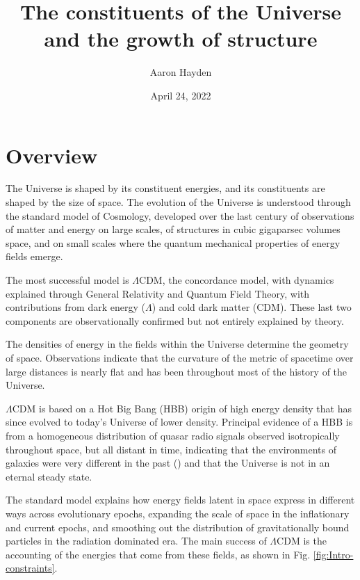 \documentclass{paper}
\begin{document}
 

\title{The constituents of the Universe and the growth of structure}
\author{Aaron Hayden}
\date{April 24, 2022}
\maketitle

\section*{Overview}
  The Universe is shaped by its constituent energies, and its constituents are
  shaped by the size of space. The evolution of the Universe is understood 
  through the standard model of Cosmology, developed over the last century of 
  observations of matter and energy on large scales, of structures in cubic 
  gigaparsec volumes space, and on small scales where the quantum mechanical 
  properties of energy fields emerge. 

  The most successful model is $\Lambda$CDM, the concordance model, with 
  dynamics explained through General Relativity and Quantum Field Theory, with 
  contributions from dark energy ($\Lambda$) and cold dark matter (CDM). These 
  last two components are observationally confirmed but not entirely explained 
  by theory. 

  The densities of energy in the fields within the Universe determine the 
  geometry of space.  Observations indicate that the curvature of the metric 
  of spacetime over large distances is nearly flat and has been throughout 
  most of the history of the Universe.
  
  $\Lambda$CDM is based on a Hot Big Bang (HBB) origin of high energy density 
  that has since evolved to today's Universe of lower density.  Principal 
  evidence of a HBB is from a homogeneous distribution of quasar radio signals 
  observed isotropically throughout space, but all distant in time, indicating 
  that the environments of galaxies were very different in the past 
  (\cite{Secrest_2021}) and that the Universe is not in an eternal steady 
  state. 

  The standard model explains how energy fields latent in space express in 
  different ways across evolutionary epochs, expanding the scale of space in 
  the inflationary and current epochs, and smoothing out the distribution of 
  gravitationally bound particles in the radiation dominated era. The main 
  success of $\Lambda$CDM is the accounting of the energies that come from 
  these fields, as shown in Fig. \ref{fig:Intro-constraints}. 
\end{document}
